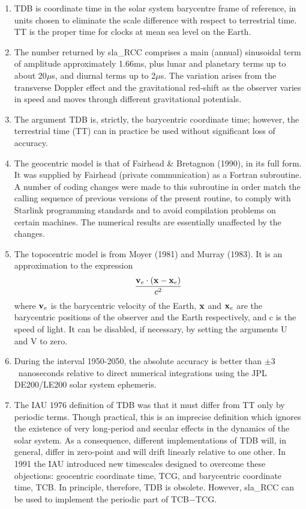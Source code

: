 \documentclass[11pt,twoside]{article}
\begin{document}
{
 \begin{enumerate}
  \item TDB is coordinate time in the solar system barycentre frame
        of reference, in units chosen to eliminate the scale difference
        with respect to terrestrial time.  TT is the proper
        time for clocks at mean sea level on the Earth.
  \item The number returned by sla\_RCC comprises
        a main (annual) sinusoidal term of amplitude
        approximately 1.66ms, plus lunar and planetary terms up to about
        20$\mu$s, and diurnal terms up to 2$\mu$s.  The
        variation arises from the transverse Doppler effect and the
        gravitational red-shift as the observer varies in speed and
        moves through different gravitational potentials.
  \item The argument TDB is, strictly, the barycentric coordinate time;
        however, the terrestrial time (TT) can in practice be used without
        significant loss of accuracy.
  \item The geocentric model is that of Fairhead \& Bretagnon (1990), in
        its full form.  It was supplied by Fairhead (private communication)
        as a Fortran subroutine.  A number of coding changes were made to
        this subroutine in order
        match the calling sequence of previous versions of the present
        routine, to comply with Starlink programming standards and to
        avoid compilation problems on certain machines.  The
        numerical results are essentially unaffected by the
        changes.
  \item The topocentric model is from Moyer (1981) and Murray (1983).
        It is an approximation to the expression
        \[\frac{{\bf v}_e \cdot ( {\bf x} - {\bf x}_e )}{c^2}\]
        where ${\bf v}_e$ is the barycentric velocity of
        the Earth, ${\bf x}$ and ${\bf x}_e$ are the barycentric positions
        of the observer and the Earth respectively, and
        c is the speed of light.
        It can be disabled, if necessary, by setting the arguments
        U and V to zero.
  \item During the interval 1950-2050, the absolute accuracy
        is better than $\pm3$~nanoseconds
        relative to direct numerical integrations using the JPL DE200/LE200
        solar system ephemeris.
  \item The IAU 1976 definition of TDB was that it must differ from TT only by
        periodic terms.  Though practical, this is an imprecise definition
        which ignores the existence of very long-period and secular effects
        in the dynamics of the solar system.  As a consequence, different
        implementations of TDB will, in general, differ in zero-point and
        will drift linearly relative to one other.  In 1991 the IAU introduced
        new timescales designed to overcome these objections:  geocentric coordinate
        time, TCG, and barycentric coordinate time, TCB.  In principle, therefore,
        TDB is obsolete.  However, sla\_RCC
        can be used to implement the periodic part of TCB$-$TCG.
 \end{enumerate}
}
\end{document}
